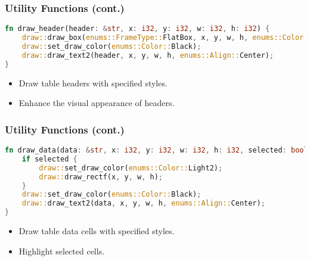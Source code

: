 \documentclass[aspectratio=169, table]{beamer}
\begin{document}
\begin{frame}[fragile]
\frametitle{Utility Functions (cont.)}
\begin{lstlisting}[language=Rust]
fn draw_header(header: &str, x: i32, y: i32, w: i32, h: i32) {
	draw::draw_box(enums::FrameType::FlatBox, x, y, w, h, enums::Color::Dark3);
	draw::set_draw_color(enums::Color::Black);
	draw::draw_text2(header, x, y, w, h, enums::Align::Center);
}
\end{lstlisting}
\begin{itemize}
\item Draw table headers with specified styles.
\item Enhance the visual appearance of headers.
\end{itemize}
\end{frame}


\begin{frame}[fragile]
\frametitle{Utility Functions (cont.)}
\begin{lstlisting}[language=Rust]
fn draw_data(data: &str, x: i32, y: i32, w: i32, h: i32, selected: bool) {
	if selected {
		draw::set_draw_color(enums::Color::Light2);
		draw::draw_rectf(x, y, w, h);
	}
	draw::set_draw_color(enums::Color::Black);
	draw::draw_text2(data, x, y, w, h, enums::Align::Center);
}
\end{lstlisting}
\begin{itemize}
\item Draw table data cells with specified styles.
\item Highlight selected cells.
\end{itemize}
\end{frame}
\end{document}
